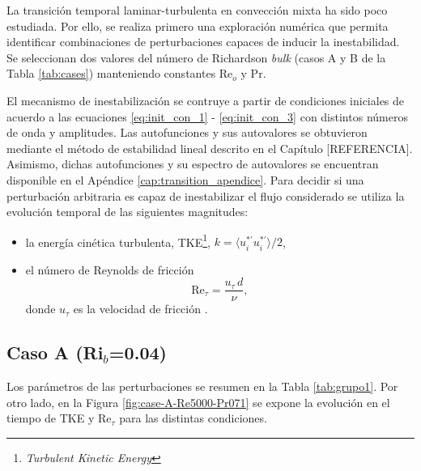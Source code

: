 La transición temporal laminar-turbulenta en convección mixta ha sido poco estudiada. Por ello, se realiza primero una exploración numérica que permita identificar combinaciones de perturbaciones capaces de inducir la inestabilidad. Se seleccionan dos valores del número de Richardson \textit{bulk} (casos A y B de la Tabla \ref{tab:cases}) manteniendo constantes Re$_o$ y Pr. 

El mecanismo de inestabilización se contruye a partir de condiciones iniciales de acuerdo a las ecuaciones \ref{eq:init_con_1} - \ref{eq:init_con_3} con distintos números de onda y amplitudes. Las autofunciones y sus autovalores se obtuvieron mediante el método de estabilidad lineal descrito en el Capítulo [REFERENCIA]. Asimismo, dichas autofunciones y su espectro de autovalores se encuentran disponible en el Apéndice \ref{cap:transition_apendice}. Para decidir si una perturbación arbitraria es capaz de inestabilizar el flujo considerado se utiliza la evolución temporal de las siguientes magnitudes:

\begin{itemize}
  \item la energía cinética turbulenta, TKE\footnote{\textit{Turbulent Kinetic Energy}}, \(k = \langle u_i^{* \prime}u_i^{* \prime}\rangle/2\),
  \item el número de Reynolds de fricción
        \[
          \text{Re}_{\tau} = \frac{u_{\tau}\,d}{\nu},
        \]
        donde \(u_{\tau}\) es la velocidad de fricción \cite{pope2001turbulent}.
\end{itemize}

\begin{table}[H]
\centering
{}
\caption{Parámetros adimensionales de los dos casos elegidos.}
\label{tab:cases}
\end{table}

\subsection{Caso A (Ri$_b$=0.04)}

Los parámetros de las perturbaciones se resumen en la Tabla \ref{tab:grupo1}. Por otro lado, en la Figura \ref{fig:case-A-Re5000-Pr071} se expone la evolución en el tiempo de TKE y Re$_{\tau}$ para las distintas condiciones. 

